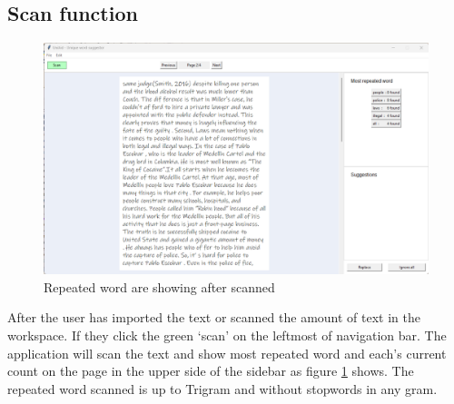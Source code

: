 \documentclass[12pt,oneside,openright,a4paper]{cpe-english-project}
\begin{document}
\subsection{Scan function}
\begin{figure}[!h]\centering
\includegraphics[width=15cm]{./img/chp4/Repeatedword.png}
\caption{Repeated word are showing after scanned}\label{fig:repeatshow}
\end{figure}
After the user has imported the text or scanned the amount of text in the workspace. If they click the green ‘scan’ on the leftmost of navigation bar. The application will scan the text and show most repeated word and each’s current count on the page in the upper side of the sidebar as figure \ref{fig:repeatshow} shows. The repeated word scanned is up to Trigram and without stopwords in any gram.
\end{document}
